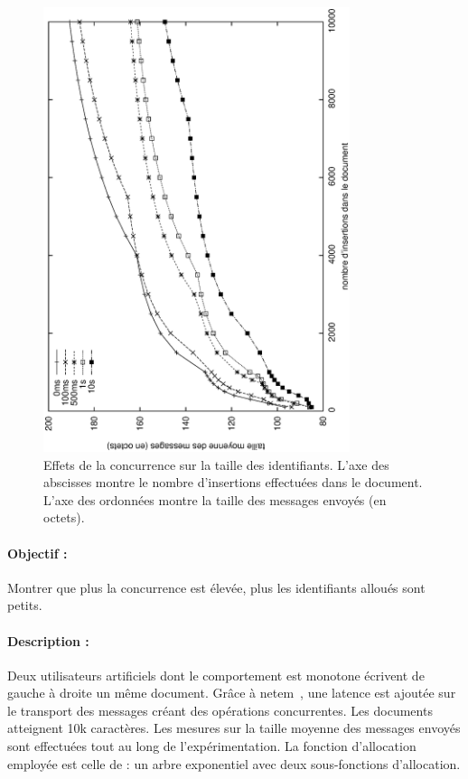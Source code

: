 \begin{figure}
  \begin{center}
    \includegraphics[angle=-90,width=0.8\textwidth]{img/lseq/latency.eps}
    \vspace{25pt}
    \caption[Effet de la concurrence sur les identifiants]
    {\label{repl:img:latency}Effets de la concurrence sur la taille des
      identifiants. L'axe des abscisses montre le nombre d'insertions effectuées
      dans le document. L'axe des ordonnées montre la taille des messages envoyés
      (en octets).}
  \end{center}
\end{figure}

\paragraph{Objectif :} Montrer que plus la concurrence est élevée, plus les
identifiants alloués sont petits.

\paragraph{Description :} Deux utilisateurs artificiels dont le comportement est
monotone écrivent de gauche à droite un même document. Grâce à
netem~\cite{netem}, une latence est ajoutée sur le transport des messages créant
des opérations concurrentes. Les documents atteignent 10k caractères. Les
mesures sur la taille moyenne des messages envoyés sont effectuées tout au long
de l'expérimentation. La fonction d'allocation employée est celle de \LSEQ : un
arbre exponentiel avec deux sous-fonctions d'allocation.

